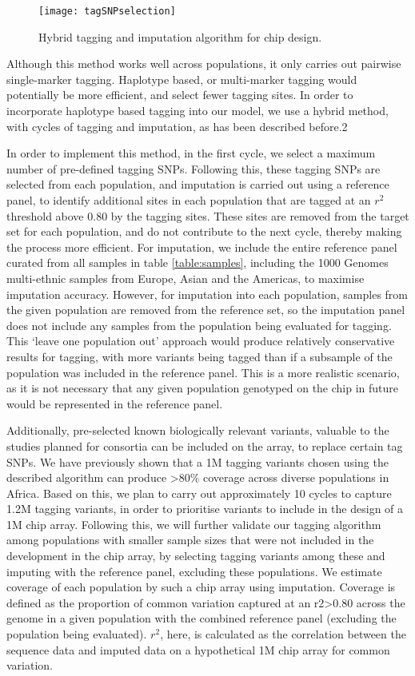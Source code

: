 \begin{figure}[h]
\caption{Hybrid tagging and imputation algorithm for chip design.}
\centering
\texttt{[image: tagSNPselection]}
\end{figure}

Although this method works well across populations, it only carries out pairwise single-marker tagging. Haplotype based, or multi-marker tagging would potentially be more efficient, and select fewer tagging sites. In order to incorporate haplotype based tagging into our model, we use a hybrid method, with cycles of tagging and imputation, as has been described before.2 

In order to implement this method, in the first cycle, we select a maximum number of pre-defined tagging SNPs. Following this, these tagging SNPs are selected from each population, and imputation is carried out using a reference panel, to identify additional sites in each population that are tagged at an $r^{2}$ threshold above 0.80 by the tagging sites. These sites are removed from the target set for each population, and do not contribute to the next cycle, thereby making the process more efficient. For imputation, we include the entire reference panel curated from all samples in table \ref{table:samples}, including the 1000 Genomes multi-ethnic samples from Europe, Asian and the Americas, to maximise imputation accuracy. However, for imputation into each population, samples from the given population are removed from the reference set, so the imputation panel does not include any samples from the population being evaluated for tagging. This ‘leave one population out’ approach would produce relatively conservative results for tagging, with more variants being tagged than if a subsample of the population was included in the reference panel. This is a more realistic scenario, as it is not necessary that any given population genotyped on the chip in future would be represented in the reference panel.

Additionally, pre-selected known biologically relevant variants, valuable to the studies planned for consortia can be included on the array, to replace certain tag SNPs. We have previously shown that a 1M tagging variants chosen using the described algorithm can produce \textgreater80\% coverage across diverse populations in Africa. Based on this, we plan to carry out approximately 10 cycles to capture 1.2M tagging variants, in order to prioritise variants to include in the design of a 1M chip array. Following this, we will further validate our tagging algorithm among populations with smaller sample sizes that were not included in the development in the chip array, by selecting tagging variants among these and imputing with the reference panel, excluding these populations. We estimate coverage of each population by such a chip array using imputation. Coverage is defined as the proportion of common variation captured at an r2>0.80 across the genome in a given population with the combined reference panel (excluding the population being evaluated). $r^{2}$, here, is calculated as the correlation between the sequence data and imputed data on a hypothetical 1M chip array for common variation. 
